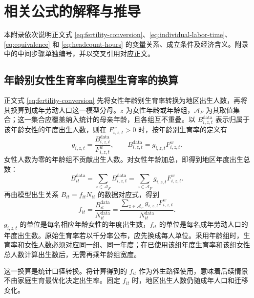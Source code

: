 \documentclass[UTF8,a4paper,zihao=-4,fontset=windows]{ctexart}
\numberwithin{equation}{section}
\begin{document}
\section{相关公式的解释与推导}
\label{app:derivations}

本附录依次说明正文式 \eqref{eq:fertility-conversion}、\eqref{eq:individual-labor-time}、\eqref{eq:equivalence} 和 \eqref{eq:headcount-hours} 的变量关系、成立条件及经济含义。附录中的中间步骤单独编号，并以交叉引用对应正文。

\subsection{年龄别女性生育率向模型生育率的换算}
\label{app:fertility-conversion}

正文式 \eqref{eq:fertility-conversion} 先将女性年龄别生育率转换为地区出生人数，再将其换算到成年劳动人口这一模型分母。$z$ 为女性年龄或年龄组，$\mathcal A_F$ 为其取值集合；这一集合应覆盖纳入统计的母亲年龄，且各组互不重叠。以 $B^{\mathrm{data}}_{i,z,t}$ 表示归属于该年龄女性的年度出生人数，则在 $F^w_{i,z,t}>0$ 时，按年龄别生育率的定义有
\begin{equation}
  g_{i,z,t}=\frac{B^{\mathrm{data}}_{i,z,t}}{F^w_{i,z,t}},
  \qquad
  B^{\mathrm{data}}_{i,z,t}=g_{i,z,t}F^w_{i,z,t}.
  \label{eq:app-age-specific-births}
\end{equation}
女性人数为零的年龄组不贡献出生人数。对女性年龄加总，即得到地区年度出生总数：
\begin{equation}
  B^{\mathrm{data}}_{it}
  =\sum_{z\in\mathcal A_F}B^{\mathrm{data}}_{i,z,t}
  =\sum_{z\in\mathcal A_F}g_{i,z,t}F^w_{i,z,t}.
  \label{eq:app-total-births}
\end{equation}
再由模型出生关系 $B_{it}=f_{it}N_{it}$ 的数据对应式，得到
\begin{equation}
  f_{it}=\frac{B^{\mathrm{data}}_{it}}{N^{\mathrm{data}}_{it}}
  =\frac{\sum_{z\in\mathcal A_F}g_{i,z,t}F^w_{i,z,t}}
         {N^{\mathrm{data}}_{it}}.
  \label{eq:app-fertility-conversion}
\end{equation}
$g_{i,z,t}$ 的单位是每名相应年龄女性的年度出生数，$f_{it}$ 的单位是每名成年劳动人口的年度出生数。原始生育率若以千分率公布，应先换成每人单位。采用年龄组时，生育率和女性人数必须对应同一组、同一年度；在已使用该组年度生育率和该组女性总人数计算出生数后，无需再乘年龄组宽度。

这一换算是统计口径转换。将计算得到的 $f_{it}$ 作为外生路径使用，意味着后续情景不由家庭生育最优化决定出生率。固定 $f_{it}$ 时，地区出生人数仍随成年人口和迁移变化。
\end{document}
